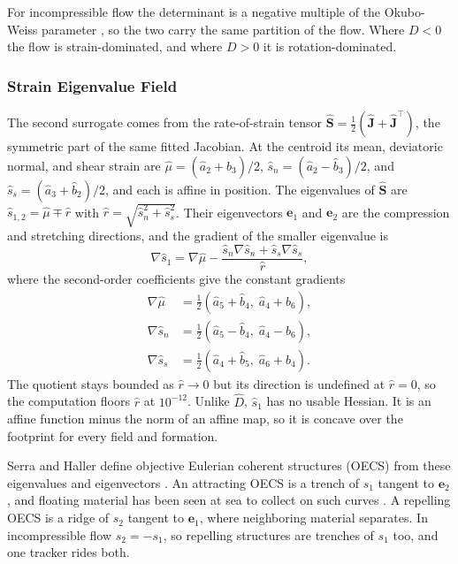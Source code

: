 \documentclass[lettersize,journal]{IEEEtran}
\begin{document}
For incompressible flow the determinant is a negative multiple of the
Okubo-Weiss parameter \cite{8,15}, so the two carry the same partition of
the flow. Where $D < 0$ the flow is strain-dominated, and where $D > 0$
it is rotation-dominated.


\subsubsection{Strain Eigenvalue Field}
The second surrogate comes from the rate-of-strain tensor
$\hat{\mathbf{S}} = \tfrac{1}{2}(\hat{\mathbf{J}} + \hat{\mathbf{J}}^{\top})$,
the symmetric part of the same fitted Jacobian.
At the centroid its mean, deviatoric normal, and shear strain are
$\hat{\mu} = (\hat{a}_2 + \hat{b}_3)/2$,
$\hat{s}_n = (\hat{a}_2 - \hat{b}_3)/2$, and
$\hat{s}_s = (\hat{a}_3 + \hat{b}_2)/2$, and each is affine in position.
The eigenvalues of $\hat{\mathbf{S}}$ are
$\hat{s}_{1,2} = \hat{\mu} \mp \hat{r}$ with
$\hat{r} = \sqrt{\hat{s}_n^2 + \hat{s}_s^2}$. Their eigenvectors
$\mathbf{e}_1$ and $\mathbf{e}_2$ are the compression and stretching
directions, and the gradient of the smaller eigenvalue is
\begin{equation}
    \nabla\hat{s}_1 = \nabla\hat{\mu}
        - \frac{\hat{s}_n\nabla\hat{s}_n + \hat{s}_s\nabla\hat{s}_s}{\hat{r}},
    \label{eq:grad_s1}
\end{equation}
where the second-order coefficients give the constant gradients
\begin{equation}
    \begin{aligned}
        \nabla\hat{\mu} &= \tfrac{1}{2}(\hat{a}_5 + \hat{b}_4,\; \hat{a}_4 + \hat{b}_6), \\
        \nabla\hat{s}_n &= \tfrac{1}{2}(\hat{a}_5 - \hat{b}_4,\; \hat{a}_4 - \hat{b}_6), \\
        \nabla\hat{s}_s &= \tfrac{1}{2}(\hat{a}_4 + \hat{b}_5,\; \hat{a}_6 + \hat{b}_4).
    \end{aligned}
    \label{eq:grad_strain}
\end{equation}
The quotient stays bounded as $\hat{r} \to 0$ but its direction is
undefined at $\hat{r} = 0$, so the computation floors $\hat{r}$ at
$10^{-12}$. Unlike $\hat{D}$, $\hat{s}_1$ has no usable Hessian. It is an
affine function minus the norm of an affine map, so it is concave over the
footprint for every field and formation.

Serra and Haller define objective Eulerian coherent structures (OECS)
from these eigenvalues and eigenvectors \cite{20}. An attracting OECS is a
trench of $s_1$ tangent to $\mathbf{e}_2$, and floating material has been
seen at sea to collect on such curves \cite{12}. A repelling OECS is a
ridge of $s_2$ tangent to $\mathbf{e}_1$, where neighboring material
separates. In incompressible flow $s_2 = -s_1$, so repelling structures are
trenches of $s_1$ too, and one tracker rides both.
\end{document}
